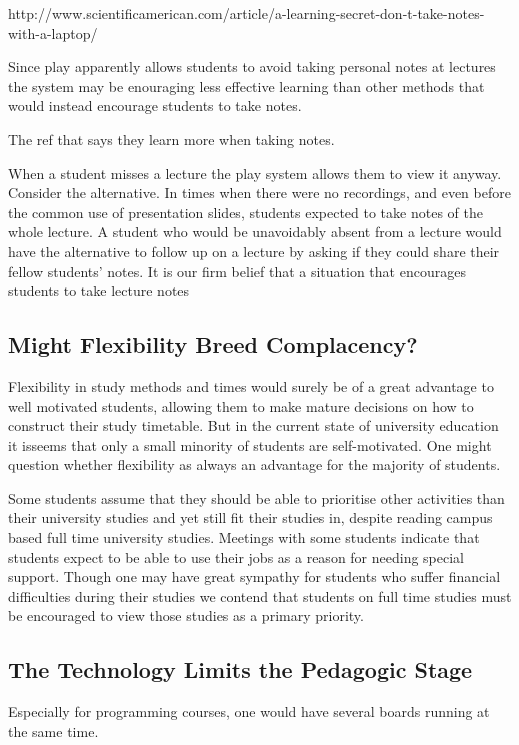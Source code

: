 \documentclass[a4paper,10pt]{article}
\begin{document}
http://www.scientificamerican.com/article/a-learning-secret-don-t-take-notes-with-a-laptop/

Since play apparently allows students to avoid taking personal notes at lectures the system may be enouraging less effective learning than other methods that would instead encourage students to take notes.


The ref that says they learn more when taking notes.



When a student misses a lecture the play system allows them to view it anyway. Consider the alternative. In times when there were no recordings, and even before the common use of presentation slides, students expected to take notes of the whole lecture. A student who would be unavoidably absent from a lecture would have the alternative to follow up on a lecture by asking if they could share their fellow students' notes. It is our firm belief that a situation that encourages students to take lecture notes

\subsection{Might Flexibility Breed Complacency?}
Flexibility in study methods and times would surely be of a great advantage to well motivated students, allowing them to make mature decisions on how to construct their study timetable. But in the current state of university education it isseems that only a small minority of students are self-motivated. One might question whether flexibility as always an advantage for the majority of students.

Some students assume that they should be able to prioritise other activities than their university studies and yet still fit their studies in, despite reading campus based full time university studies. Meetings with some students indicate that students expect to be able to use their jobs as a reason for needing special support. Though one may have great sympathy for students who suffer financial difficulties during their studies we contend that students on full time studies must be encouraged to view those studies as a primary priority.

\subsection{The Technology Limits the Pedagogic Stage}
Especially for programming courses, one would have several boards running at the same time.
\end{document}
